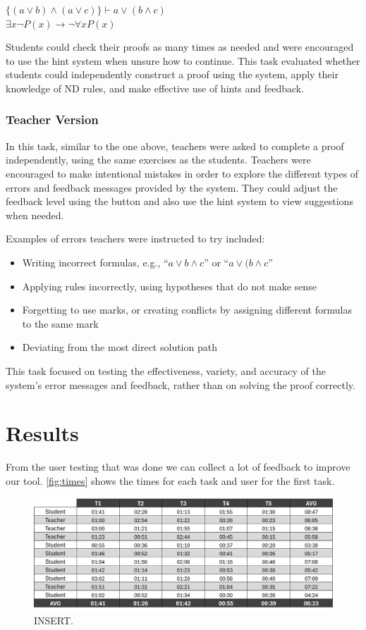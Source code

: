 \begin{center}
$\{(a \lor b) \land (a \lor c)\} \vdash a \lor (b \land c)$ \\
$\exists x \neg P(x) \to \neg \forall x P(x)$
\end{center}

Students could check their proofs as many times as needed and were encouraged to use the hint system when unsure how to continue. This task evaluated whether students could independently construct a proof using the system, apply their knowledge of \gls{ND} rules, and make effective use of hints and feedback.

\subsubsection*{Teacher Version}
In this task, similar to the one above, teachers were asked to complete a proof independently, using the same exercises as the students. Teachers were encouraged to make intentional mistakes in order to explore the different types of errors and feedback messages provided by the system. They could adjust the feedback level using the button and also use the hint system to view suggestions when needed.  

Examples of errors teachers were instructed to try included:
\begin{itemize}
    \item Writing incorrect formulas, e.g., ``$a \lor b \land c$'' or ``$a \lor (b \land c$''  
    \item Applying rules incorrectly, using hypotheses that do not make sense  
    \item Forgetting to use marks, or creating conflicts by assigning different formulas to the same mark  
    \item Deviating from the most direct solution path  
\end{itemize}

This task focused on testing the effectiveness, variety, and accuracy of the system’s error messages and feedback, rather than on solving the proof correctly.

\section{Results}
From the user testing that was done we can collect a lot of feedback to improve our tool. \autoref{fig:times} shows the times for each task and user for the first task.

\begin{figure}[h]
    \centering
    \includegraphics[width=0.95\linewidth]{Chapters/Figures/times.jpg}
    \caption{INSERT.}
    \label{fig:times}
\end{figure}

